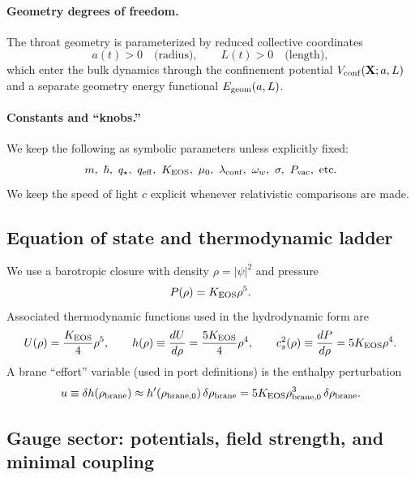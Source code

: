 \documentclass[11pt]{article}
\newcommand{\qstar}{q_\star}
\newcommand{\qeff}{q_{\rm eff}}
\begin{document}
\paragraph{Geometry degrees of freedom.}
The throat geometry is parameterized by reduced collective coordinates
\begin{equation}
  a(t)>0 \quad\text{(radius)},\qquad L(t)>0 \quad\text{(length)},
\end{equation}
which enter the bulk dynamics through the confinement potential $V_{\rm conf}(\mathbf X;a,L)$
and a separate geometry energy functional $E_{\rm geom}(a,L)$.

\paragraph{Constants and ``knobs.''}
We keep the following as symbolic parameters unless explicitly fixed:
\begin{equation}
  m,\ \hbar,\ \qstar,\ \qeff,\ K_{\rm EOS},\ \mu_0,\ \lambda_{\rm conf},\ \omega_w,\ \sigma,\ P_{\rm vac},
  \ \text{etc.}
\end{equation}
We keep the speed of light $c$ explicit whenever relativistic comparisons are made.

\subsection{Equation of state and thermodynamic ladder}

We use a barotropic closure with density $\rho=|\psi|^2$ and pressure
\begin{equation}
  P(\rho)=K_{\rm EOS}\rho^5.
\end{equation}
Associated thermodynamic functions used in the hydrodynamic form are
\begin{equation}
  U(\rho)=\frac{K_{\rm EOS}}{4}\rho^5,\qquad
  h(\rho)\equiv \frac{dU}{d\rho}=\frac{5K_{\rm EOS}}{4}\rho^4,\qquad
  c_s^2(\rho)\equiv \frac{dP}{d\rho}=5K_{\rm EOS}\rho^4.
\end{equation}
A brane ``effort'' variable (used in port definitions) is the enthalpy perturbation
\begin{equation}
  u \equiv \delta h(\rho_{\rm brane})
  \approx h'(\rho_{\rm brane,0})\,\delta\rho_{\rm brane}
  = 5K_{\rm EOS}\rho_{\rm brane,0}^3\,\delta\rho_{\rm brane}.
\end{equation}

\subsection{Gauge sector: potentials, field strength, and minimal coupling}
\end{document}
